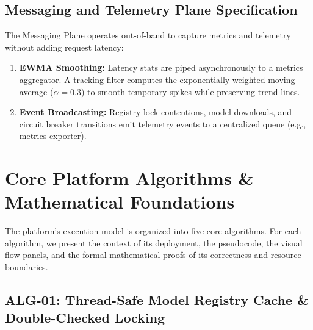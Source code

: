 \documentclass[11pt,a4paper]{article}
\theoremstyle{plain}
\theoremstyle{definition}
\theoremstyle{remark}
\begin{document}
\subsection{Messaging and Telemetry Plane Specification}
The Messaging Plane operates out-of-band to capture metrics and telemetry without adding request latency:
\begin{enumerate}
    \item \textbf{EWMA Smoothing:} Latency stats are piped asynchronously to a metrics aggregator. A tracking filter computes the exponentially weighted moving average ($\alpha=0.3$) to smooth temporary spikes while preserving trend lines.
    \item \textbf{Event Broadcasting:} Registry lock contentions, model downloads, and circuit breaker transitions emit telemetry events to a centralized queue (e.g., metrics exporter).
\end{enumerate}

\section{Core Platform Algorithms \& Mathematical Foundations}\label{sec:algorithms}

\noindent The platform's execution model is organized into five core algorithms. For each algorithm, we present the context of its deployment, the pseudocode, the visual flow panels, and the formal mathematical proofs of its correctness and resource boundaries.

\subsection{ALG-01: Thread-Safe Model Registry Cache \& Double-Checked Locking}
\label{subsec:alg01}
\end{document}
